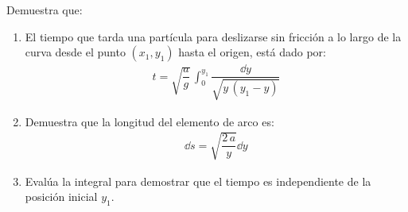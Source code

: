 \begin{enumerate}
Demuestra que:
\begin{enumerate}[label=\roman*)]
\item El tiempo que tarda una partícula para deslizarse sin fricción a lo largo de la curva desde el punto $(x_{1}, y_{1})$ hasta el origen, está dado por:
\begin{align*}
    t = \sqrt{\dfrac{a}{g}} \, \int_{0}^{y_{1}} \dfrac{\dd{y}}{\sqrt{y \, (y_{1}- y)}}
\end{align*}
\item Demuestra que la longitud del elemento de arco es:
\begin{align*}
    \dd{s} = \sqrt{\dfrac{2 \, a}{y}} \dd{y}
\end{align*}
\item Evalúa la integral para demostrar que el tiempo es independiente de la posición inicial $y_{1}$.
\end{enumerate}
\end{enumerate}
